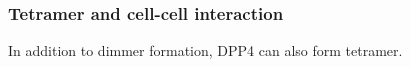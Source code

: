 \subsubsection{Tetramer and cell-cell interaction}

In addition to dimmer formation, DPP4 can also form tetramer.